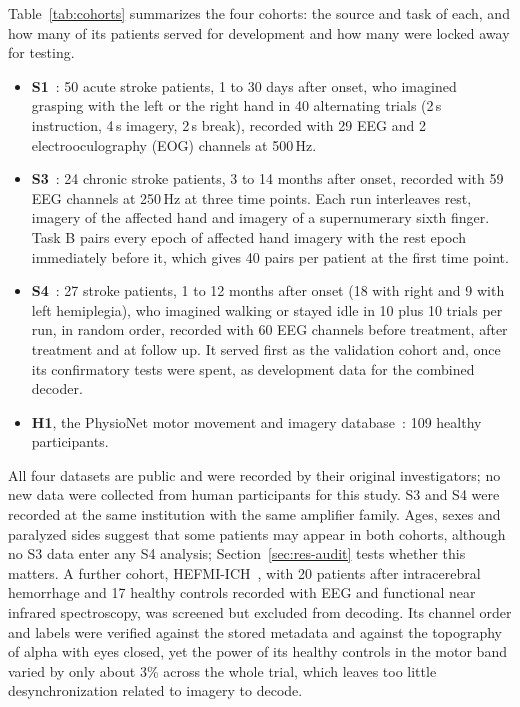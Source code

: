 \documentclass{ieeeaccess}
\begin{document}
Table~\ref{tab:cohorts} summarizes the four cohorts: the source and task of each, and how many of its patients served for development and how many were locked away for testing.
\begin{itemize}
\item \textbf{S1}~\cite{liu2024}: 50 acute stroke patients, 1 to 30 days after onset, who imagined grasping with the left or the right hand in 40 alternating trials (2\,s instruction, 4\,s imagery, 2\,s break), recorded with 29 EEG and 2 electrooculography (EOG) channels at 500\,Hz.
\item \textbf{S3}~\cite{wang2026}: 24 chronic stroke patients, 3 to 14 months after onset, recorded with 59 EEG channels at 250\,Hz at three time points. Each run interleaves rest, imagery of the affected hand and imagery of a supernumerary sixth finger. Task B pairs every epoch of affected hand imagery with the rest epoch immediately before it, which gives 40 pairs per patient at the first time point.
\item \textbf{S4}~\cite{liu2025gait}: 27 stroke patients, 1 to 12 months after onset (18 with right and 9 with left hemiplegia), who imagined walking or stayed idle in 10 plus 10 trials per run, in random order, recorded with 60 EEG channels before treatment, after treatment and at follow up. It served first as the validation cohort and, once its confirmatory tests were spent, as development data for the combined decoder.
\item \textbf{H1}, the PhysioNet motor movement and imagery database~\cite{schalk2004,goldberger2000}: 109 healthy participants.
\end{itemize}
All four datasets are public and were recorded by their original investigators; no new data were collected from human participants for this study. S3 and S4 were recorded at the same institution with the same amplifier family. Ages, sexes and paralyzed sides suggest that some patients may appear in both cohorts, although no S3 data enter any S4 analysis; Section~\ref{sec:res-audit} tests whether this matters. A further cohort, HEFMI-ICH~\cite{shi2025}, with 20 patients after intracerebral hemorrhage and 17 healthy controls recorded with EEG and functional near infrared spectroscopy, was screened but excluded from decoding. Its channel order and labels were verified against the stored metadata and against the topography of alpha with eyes closed, yet the power of its healthy controls in the motor band varied by only about 3\% across the whole trial, which leaves too little desynchronization related to imagery to decode.
\end{document}

